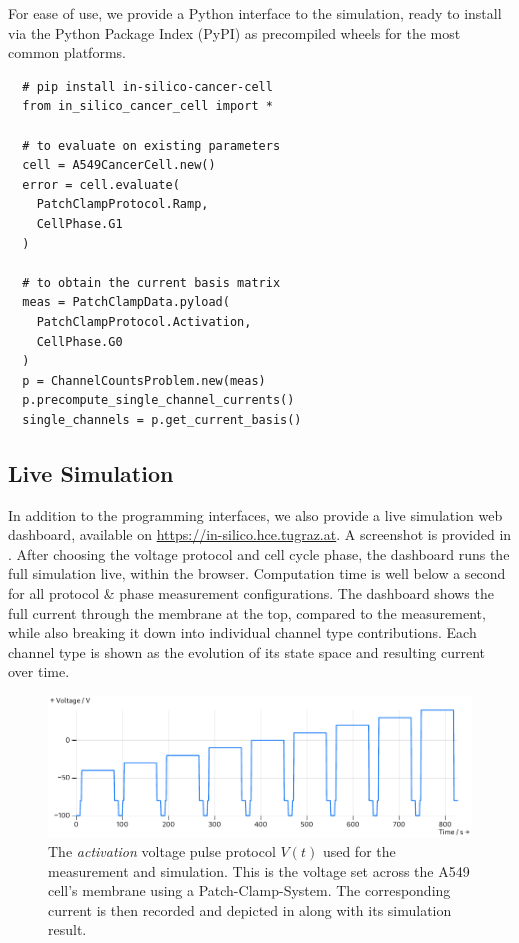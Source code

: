 For ease of use, we provide a Python interface to the simulation, ready to install via the Python Package Index (PyPI) as precompiled wheels for the most common platforms.

\begin{verbatim}
  # pip install in-silico-cancer-cell
  from in_silico_cancer_cell import *

  # to evaluate on existing parameters
  cell = A549CancerCell.new()
  error = cell.evaluate(
    PatchClampProtocol.Ramp,
    CellPhase.G1
  )

  # to obtain the current basis matrix
  meas = PatchClampData.pyload(
    PatchClampProtocol.Activation,
    CellPhase.G0
  )
  p = ChannelCountsProblem.new(meas)
  p.precompute_single_channel_currents()
  single_channels = p.get_current_basis()
\end{verbatim}

\subsection{Live Simulation}
In addition to the programming interfaces, we also provide a live simulation web dashboard, available on \url{https://in-silico.hce.tugraz.at}. A screenshot is provided in .
After choosing the voltage protocol and cell cycle phase, the dashboard runs the full simulation live, within the browser.
Computation time is well below a second for all protocol \& phase measurement configurations.
The dashboard shows the full current through the membrane at the top, compared to the measurement, while also breaking it down into individual channel type contributions.
Each channel type is shown as the evolution of its state space and resulting current over time.

\begin{figure}
  \includegraphics[width=\columnwidth]{../figures/results/voltage-protocol.pdf}
  \caption{The \textit{activation} voltage pulse protocol $V(t)$ used for the measurement and simulation. This is the voltage set across the A549 cell's membrane using a Patch-Clamp-System. The corresponding current is then recorded and depicted in  along with its simulation result.}
  \label{figure:voltage-protocol}
\end{figure}

